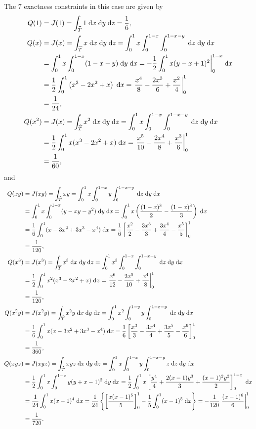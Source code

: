 \documentclass{homework}
\begin{document}
\begin{alphaparts}
		The 7 exactness constraints in this case are given by
		\newcommand{\dv}{\dee x \dee y \dee z}
		\begin{align*}
			Q(1) &= J(1) = \int_{\Th}1 \dv = \frac{1}{6}, \\
			Q(x) &= J(x) = \int_{\Th}x \dv = \int_{0}^1x \int_0^{1-x}\int_0^{1-x-y}\dee z\dee y\dee x\\
			&= \int_0^1 x\int_0^{1-x}(1-x-y)\dee y \dee x = -\frac{1}{2}\int_0^1x(y-x+1)^2\bigg|_0^{1-x}\dee x \\
			&= \frac{1}{2}\int_0^1\left(x^3 - 2x^2 + x\right)\dee x = \left.\frac{x^4}{8} - \frac{2x^3}{6} + \frac{x^2}{4}\right|_0^1 \\
			&= \frac{1}{24},\\
			Q(x^2) &= J(x) = \int_{\Th}x^2\dv = \int_0^1x\int_0^{1-x}\int_0^{1-x-y}\dee z\dee y\dee x \\
			&= \frac{1}{2}\int_0^1x(x^3 -2x^2+x)\dee x = \left.\frac{x^5}{10} - \frac{2x^4}{8} + \frac{x^3}{6}\right|_0^1 \\
			&= \frac{1}{60},
		\end{align*}
		and
		\begin{align*}
			Q(xy) &= J(xy) = \int_{\Th}xy = \int_0^1x\int_0^{1-x}y\int_0^{1-x-y}\dee z\dee y\dee x \\
			&= \int_0^1x\int_0^{1-x}(y-xy-y^2)\dee y\dee x =\int_0^1x\left(\frac{(1-x)^3}{2} - \frac{(1-x)^3}{3}\right) \dee x \\
			&= \frac{1}{6}\int_0^1 (x - 3x^2 + 3x^3 - x^4)\dee x = \frac{1}{6}\left[\frac{x^2}{2}- \frac{3x^3}{3} + \frac{3x^4}{4} - \frac{x^5}{5}\right]_0^1 \\
			&= \frac{1}{120}, \\
			Q(x^3) &= J(x^3) = \int_{\Th}x^3\dv = \int_0^1x^3\int_0^{1-x}\int_0^{1-x-y}\dee z\dee y \dee x \\
			&= \frac{1}{2}\int_0^1x^2(x^3-2x^2+x)\dee x = \left.\frac{x^6}{12} - \frac{2x^5}{10} + \frac{x^4}{8}\right|_0^1 \\
			&= \frac{1}{120},\\
			Q(x^2y) &= J(x^2y) = \int_{\Th}x^2y\dv = \int_0^1x^2\int_0^{1-y}y\int_0^{1-x-y}\dee z \dee y \dee x\\
			&= \frac{1}{6}\int_0^1x(x-3x^2+3x^3-x^4)\dee x = \frac{1}{6}\left[\frac{x^3}{3} - \frac{3x^4}{4} + \frac{3x^5}{5} - \frac{x^6}{6}\right]_0^1 \\
			&= \frac{1}{360}, \\
			Q(xyz) &= J(xyz) = \int_{\Th}xyz\dv = \int_0^1x\int_0^{1-x}y\int_0^{1-x-y}z\dee z\dee y \dee x \\
			&= \frac{1}{2}\int_0^1x\int_0^{1-x}y(y +x-1)^2\dee y \dee x = \frac{1}{2}\int_0^1x\left[\frac{y^4}{4} + \frac{2(x-1)y^3}{3} + \frac{(x-1)^2y^2}{2}\right]_0^{1-x}\dee x \\
			&= \frac{1}{24}\int_0^1x(x-1)^4 \dee x = \frac{1}{24}\left\{\left[\frac{x(x-1)^5}{5}\right]_0^1 - \frac{1}{5}\int_0^1 (x-1)^5\dee x\right\} = -\frac{1}{120}\left.\frac{(x-1)^6}{6}\right|_0^1 \\
			&= \frac{1}{720}.
		\end{align*}
		

\end{alphaparts}
\end{document}
